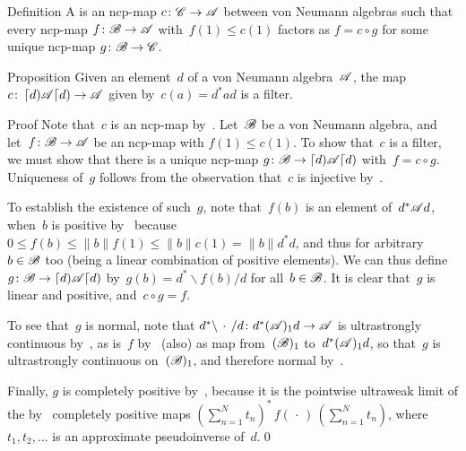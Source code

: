 \documentclass[a]{subfiles}
\begin{document}
\begin{parsec}%
\begin{point}{Definition}%
A 
is an ncp-map $c\colon \mathscr{C}\to\mathscr{A}$
between von Neumann algebras
such that every ncp-map $f\colon \mathscr{B}\to\mathscr{A}$
with~$f(1)\leq c(1)$
factors as $f=c\circ g$
for some unique ncp-map $g \colon \mathscr{B}\to\mathscr{C}$.
\end{point}
\begin{point}{Proposition}%
Given an element~$d$ of a von Neumann algebra~$\mathscr{A}$,
the map $c\colon \left\lceil d\right)\!\mathscr{A}\!\left\lceil d\right)\to\mathscr{A}$
given by~$c(a)=d^*ad$
is a filter.
\begin{point}{Proof}%
Note that~$c$ is an ncp-map by~.
Let~$\mathscr{B}$ be a von Neumann algebra,
and let~$f\colon \mathscr{B}\to\mathscr{A}$ be an ncp-map
with $f(1)\leq c(1)$.
To show that~$c$ is a filter,
we must show that there is a unique ncp-map
$g\colon \mathscr{B}\to
\left\lceil d\right)\!\mathscr{A}\!\left\lceil d\right)$
with~$f=c\circ g$.
Uniqueness of~$g$ follows from the observation
that~$c$ is injective by~.

To establish the existence of such~$g$,
note that~$f(b)$ is an element of~$d^*\mathscr{A} d$,
when~$b$ is positive
by~
because~$0\leq f(b)\leq \|b\|f(1)\leq \|b\| c(1)=\|b\|d^*d$,
and thus for arbitrary~$b\in\mathscr{B}$ too
(being a linear combination
of positive elements).
We can thus define $g\colon \mathscr{B}\to \left\lceil d\right)\!\mathscr{A}\!\left\lceil d\right)$
by~$g(b)=d^*\backslash f(b)/d$
for all~$b\in\mathscr{B}$.
It is clear that~$g$ is linear and positive,
and~$c\circ g=f$.

To see that~$g$ is normal,
note that
$d^*\backslash\,\cdot\,/d\colon
d^*(\mathscr{A})_1 d\to\mathscr{A}$
is ultrastrongly continuous by~,
as is~$f$ by~
(also) as map from~$(\mathscr{B})_1$ to~$d^*(\mathscr{A})_1 d$,
so that~$g$ is ultrastrongly continuous on~$(\mathscr{B})_1$,
and therefore normal by~.

Finally, $g$ is completely positive
by~,
because it is
the pointwise ultraweak limit
of the by~ completely positive maps
$(\sum_{n=1}^Nt_n)^* \,f(\,\cdot\,)\,(\sum_{n=1}^N t_n)$,
where~$t_1,t_2,\dotsc$
is an approximate pseudoinverse of~$d$.\qed
\end{point}
\end{point}
\end{parsec}
\end{document}
